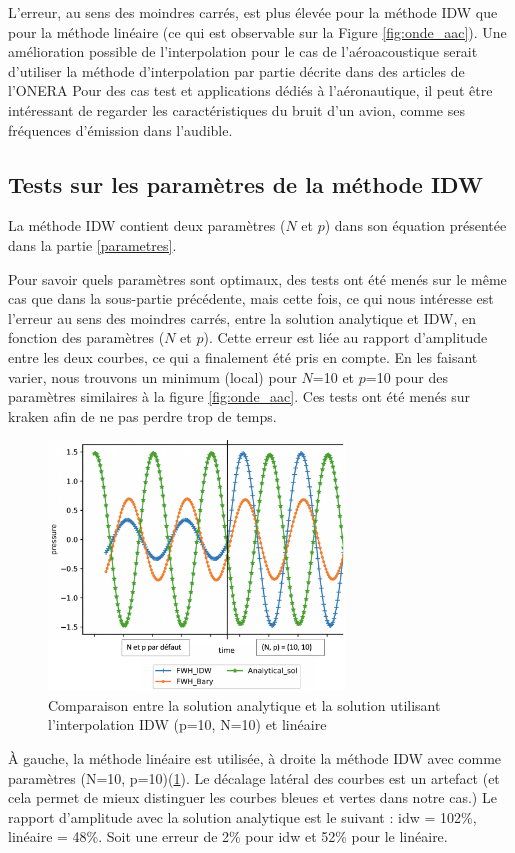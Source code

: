 L'erreur, au sens des moindres carrés, est plus élevée pour la méthode IDW que pour la méthode linéaire (ce qui est observable sur la Figure \ref{fig:onde_aac}).
Une amélioration possible de l'interpolation pour le cas de l'aéroacoustique serait d'utiliser la méthode d'interpolation par partie décrite dans des articles de l’ONERA \cite{cunha2011, cunha2016}
Pour des cas test et applications dédiés à l'aéronautique, il peut être intéressant de regarder les caractéristiques du bruit d'un avion, comme ses fréquences d'émission dans l'audible. \cite{frequence}

\subsection{Tests sur les paramètres de la méthode IDW}

La méthode IDW contient deux paramètres (\(N\) et \(p\)) dans son équation présentée dans la partie \ref{parametres}.

Pour savoir quels paramètres sont optimaux, des tests ont été menés sur le même cas que dans la sous-partie précédente, mais cette fois, ce qui nous intéresse est l'erreur au sens des moindres carrés, entre la solution analytique et IDW, en fonction des paramètres (\(N\) et \(p\)). Cette erreur est liée au rapport d'amplitude entre les deux courbes, ce qui a finalement été pris en compte. En les faisant varier, nous trouvons un minimum (local) pour \(N\)=10 et \(p\)=10 pour des paramètres similaires à la figure \ref{fig:onde_aac}.
Ces tests ont été menés sur kraken afin de ne pas perdre trop de temps.

\begin{figure}[H]
    \centering
    \includegraphics[width=0.70\textwidth]{images/rapport_a_np.png}
    \caption{Comparaison entre la solution analytique et la solution utilisant l'interpolation IDW (p=10, N=10) et linéaire}
    \label{fig:np10}
\end{figure}

À gauche, la méthode linéaire est utilisée, à droite la méthode IDW avec comme paramètres (N=10, p=10)(\ref{fig:np10}). Le décalage latéral des courbes est un artefact (et cela permet de mieux distinguer les courbes bleues et vertes dans notre cas.)
Le rapport d'amplitude avec la solution analytique est le suivant : idw = 102\%, linéaire = 48\%. Soit une erreur de 2\% pour idw et 52\% pour le linéaire. %







